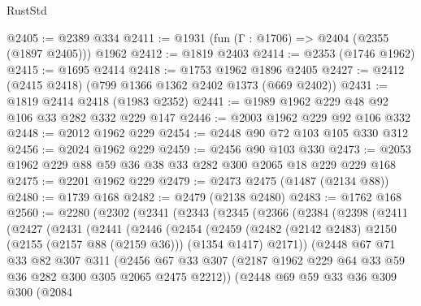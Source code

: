 \begin{lexlean}{RustStd}
\begin{coremodule}
@2405 := @2389 @334
@2411 := @1931 (fun (Γ : @1706) => @2404 (@2355 (@1897 @2405))) @1962
@2412 := @1819 @2403
@2414 := @2353 (@1746 @1962)
@2415 := @1695 @2414
@2418 := @1753 @1962 @1896 @2405
@2427 := @2412 (@2415 @2418) (@799 @1366 @1362 @2402 @1373 (@669 @2402))
@2431 := @1819 @2414 @2418 (@1983 @2352)
@2441 := @1989 @1962 @229 @48 @92 @106 @33 @282 @332 @229 @147
@2446 := @2003 @1962 @229 @92 @106 @332
@2448 := @2012 @1962 @229
@2454 := @2448 @90 @72 @103 @105 @330 @312
@2456 := @2024 @1962 @229
@2459 := @2456 @90 @103 @330
@2473 := @2053 @1962 @229 @88 @59 @36 @38 @33 @282 @300 @2065 @18 @229 @229 @168
@2475 := @2201 @1962 @229
@2479 := @2473 @2475 (@1487 (@2134 @88))
@2480 := @1739 @168
@2482 := @2479 (@2138 @2480)
@2483 := @1762 @168
@2560 := @2280
    (@2302
      (@2341
        (@2343
          (@2345
            (@2366
              (@2384
                (@2398
                  (@2411
                    (@2427
                      (@2431
                        (@2441
                          (@2446
                            (@2454
                              (@2459
                                (@2482
                                  (@2142 @2483)
                                  @2150
                                  (@2155 (@2157 @88 (@2159 @36)))
                                  (@1354 @1417)
                                  @2171))
                              (@2448
                                @67
                                @71
                                @33
                                @82
                                @307
                                @311
                                (@2456
                                  @67
                                  @33
                                  @307
                                  (@2187
                                    @1962
                                    @229
                                    @64
                                    @33
                                    @59
                                    @36
                                    @282
                                    @300
                                    @305
                                    @2065
                                    @2475
                                    @2212))
                                (@2448
                                  @69
                                  @59
                                  @33
                                  @36
                                  @309
                                  @300
                                  (@2084

\end{coremodule}
\end{lexlean}
